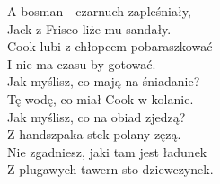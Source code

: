 A bosman - czarnuch zapleśniały, \\
Jack z Frisco liże mu sandały. \\

Cook lubi z chłopcem pobaraszkować \\
I nie ma czasu by gotować. \\

Jak myślisz, co mają na śniadanie? \\
Tę wodę, co miał Cook w kolanie. \\

Jak myślisz, co na obiad zjedzą? \\
Z handszpaka stek polany zęzą. \\

Nie zgadniesz, jaki tam jest ładunek \\
Z plugawych tawern sto dziewczynek. \\
